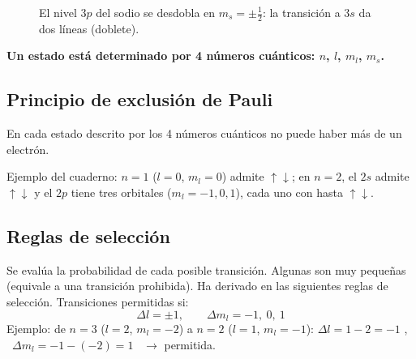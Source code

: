\documentclass[11pt,a4paper]{article}
\begin{document}
\begin{figure}[H]
\centering
{}
\caption{El nivel $3p$ del sodio se desdobla en $m_s=\pm\tfrac12$: la transición a $3s$ da dos líneas (doblete).}
\end{figure}

\textbf{Un estado está determinado por 4 números cuánticos: $n$, $l$, $m_l$, $m_s$.}

\subsection{Principio de exclusión de Pauli}
En cada estado descrito por los 4 números cuánticos no puede haber más de un electrón.

Ejemplo del cuaderno: $n=1$ ($l=0$, $m_l=0$) admite $\uparrow\downarrow$; en $n=2$, el $2s$ admite $\uparrow\downarrow$ y el
$2p$ tiene tres orbitales ($m_l=-1,0,1$), cada uno con hasta $\uparrow\downarrow$.

\subsection{Reglas de selección}
Se evalúa la probabilidad de cada posible transición. Algunas son muy pequeñas (equivale a una transición prohibida).
Ha derivado en las siguientes reglas de selección. Transiciones permitidas si:
\[
\boxed{\Delta l=\pm1,\qquad \Delta m_l=-1,\ 0,\ 1}
\]
Ejemplo: de $n=3$ ($l=2$, $m_l=-2$) a $n=2$ ($l=1$, $m_l=-1$): $\Delta l=1-2=-1$ \checkmark, \
$\Delta m_l=-1-(-2)=1$ \checkmark\ $\rightarrow$ permitida.
\end{document}
